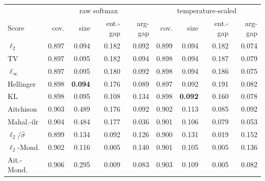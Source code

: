 \begin{tabular}{lrrrrrrrr}
\toprule
 & \multicolumn{4}{c}{raw softmax} & \multicolumn{4}{c}{temperature-scaled} \\
Score & cov. & size & ent.-gap & arg-gap & cov. & size & ent.-gap & arg-gap \\
\midrule
$\ell_2$ & 0.897 & 0.094 & 0.182 & 0.092 & 0.899 & 0.094 & 0.182 & 0.074 \\
TV & 0.897 & 0.095 & 0.182 & 0.094 & 0.898 & 0.094 & 0.187 & 0.079 \\
$\ell_\infty$ & 0.897 & 0.095 & 0.180 & 0.092 & 0.898 & 0.094 & 0.186 & 0.075 \\
Hellinger & 0.898 & \textbf{0.094} & 0.176 & 0.089 & 0.897 & 0.092 & 0.191 & 0.082 \\
KL & 0.898 & 0.095 & 0.108 & 0.134 & 0.898 & \textbf{0.092} & 0.160 & 0.078 \\
Aitchison & 0.903 & 0.489 & 0.176 & 0.092 & 0.902 & 0.113 & 0.085 & 0.092 \\
Mahal.-ilr & 0.904 & 0.484 & 0.177 & 0.036 & 0.901 & 0.106 & 0.079 & 0.053 \\
$\ell_2/\hat\sigma$ & 0.899 & 0.134 & 0.092 & 0.126 & 0.900 & 0.131 & 0.019 & 0.152 \\
$\ell_2$-Mond. & 0.902 & 0.116 & 0.005 & 0.140 & 0.901 & 0.105 & 0.005 & 0.136 \\
Ait.-Mond. & 0.906 & 0.295 & 0.009 & 0.083 & 0.903 & 0.109 & 0.005 & 0.082 \\
\bottomrule
\end{tabular}